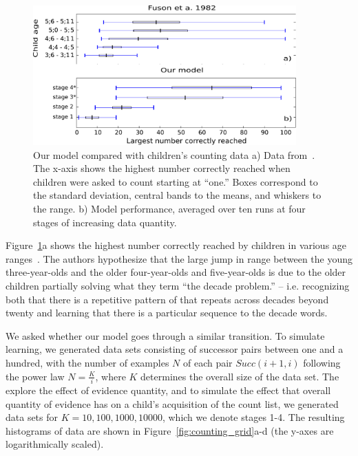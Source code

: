 \documentclass[10pt,letterpaper]{article}
\begin{document}
\begin{figure}[t]
\includegraphics[width=0.9\textwidth]{figures/modelboxplot}
\caption{Our model compared with children's counting data a) Data
  from~\citet{FusRicBriar1982}. The x-axis shows the highest number
  correctly reached when children were asked to count starting at
  ``one.'' Boxes correspond to the standard deviation, central bands
  to the means, and whiskers to the range. b) Model performance,
  averaged over ten runs at four stages of increasing data quantity.
\label{fig:fuson_model_comparison}}
\end{figure}

Figure~\ref{fig:fuson_model_comparison}a shows the highest number
correctly reached by children in various age
ranges~\cite{FusRicBriar1982}. The authors hypothesize that the large
jump in range between the young three-year-olds and the older
four-year-olds and five-year-olds is due to the older children
partially solving what they term ``the decade problem.'' -- i.e.
recognizing both that there is a repetitive pattern of that repeats
across decades beyond twenty and learning that there is a particular
sequence to the decade words.

We asked whether our model goes through a similar transition. To
simulate learning, we generated data sets consisting of successor
pairs between one and a hundred, with the number of examples $N$ of each
pair $Succ(i+1, i)$ following the power law $N=\frac{K}{i}$, where $K$
determines the overall size of the data set. The explore the effect of
evidence quantity, and to simulate the effect that overall quantity
of evidence has on a child's acquisition of the count list, we
generated data sets for $K=10, 100, 1000, 10000$, which we denote
stages 1-4. The resulting histograms of data are shown in
Figure~\ref{fig:counting_grid}a-d (the y-axes are logarithmically
scaled).
\end{document}
